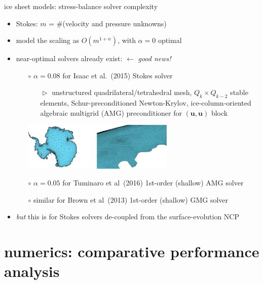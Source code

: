 \documentclass[svgnames,
               hyperref={colorlinks,citecolor=DeepPink4,linkcolor=FireBrick,urlcolor=Maroon},
               usepdftitle=false]  %
               {beamer}
\newcommand{\bu}{\mathbf{u}}
\begin{document}
\begin{frame}{ice sheet models: stress-balance solver complexity}

\begin{itemize}
\item Stokes: \quad $m$ = \#(velocity and pressure unknowns)
\item model the scaling as $O(m^{1+\alpha})$, with $\alpha=0$ optimal
\item \alert{near-optimal solvers} already exist: \hfill $\leftarrow$ \emph{good news!}
    \begin{itemize}
    \item[$\circ$] $\alpha=0.08$ for Isaac et al.~(2015) Stokes solver
        \begin{itemize}
        \item[$\vartriangleright$] unstructured quadrilateral/tetrahedral mesh, $Q_k\times Q_{k-2}$ stable elements, Schur-preconditioned Newton-Krylov, ice-column-oriented algebraic multigrid (AMG) preconditioner for $(\bu,\bu)$ block
        \end{itemize}

\begin{center}
\includegraphics[width=0.6\textwidth]{../images/isaac-antarctica.png}
\end{center}
    \item[$\circ$] $\alpha=0.05$ for Tuminaro et al~(2016) 1st-order (shallow) AMG solver
    \item[$\circ$] similar for Brown et al~(2013) 1st-order (shallow) GMG solver
    \end{itemize}
\item \emph{but} this is for Stokes solvers \alert{de-coupled} from the surface-evolution NCP
\end{itemize}
\end{frame}



\section{numerics: comparative performance analysis}
\end{document}
